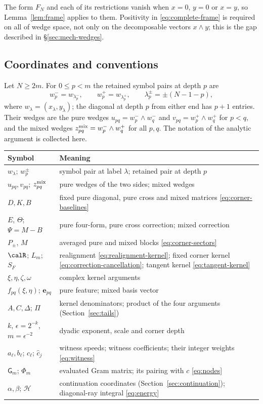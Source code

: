 The form $F_N$ and each of its restrictions vanish when $x=0$, $y=0$ or
$x=y$, so Lemma~\ref{lem:frame} applies to them. Positivity in
\eqref{eq:complete-frame} is required on all of wedge space, not only on
the decomposable vectors $x\wedge y$; this is the gap described in
\S\ref{sec:mech-wedges}.

\subsection{Coordinates and conventions}
Let $N\ge2m$. For $0\le p<m$ the retained symbol pairs at depth $p$ are
\[
 w_p^-=w_{\lambda_p^-},\qquad w_p^+=w_{\lambda_p^+},\qquad
 \lambda_p^\pm=\pm(N-1-p),
\]
where $w_\lambda=(x_\lambda,y_\lambda)$; the diagonal at depth $p$ from
either end has $p+1$ entries. Their wedges are the pure wedges
\(u_{pq}=w_p^-\wedge w_q^-\) and \(v_{pq}=w_p^+\wedge w_q^+\) for \(p<q\),
and the mixed wedges \(z^{\rm mix}_{pq}=w_p^-\wedge w_q^+\) for all \(p,q\).
The notation of the analytic argument is collected here.
\begin{center}
\begin{tabular}{@{}p{}p{}@{}}
\toprule
Symbol & Meaning\\\midrule
$w_\lambda$; $w_p^\pm$ & symbol pair at label $\lambda$; retained pair at depth $p$\\
$u_{pq},v_{pq}$; $z^{\rm mix}_{pq}$ & pure wedges of the two sides; mixed wedges\\
$D,K,B$ & fixed pure diagonal, pure cross and mixed matrices \eqref{eq:corner-baselines}\\
$E$, $\Theta$; $\Psi=M-B$ & pure four-form, pure cross correction; mixed correction\\
$P_\pm$, $M$ & averaged pure and mixed blocks \eqref{eq:corner-sectors}\\
$\calR$; $L_m$; $S_F$ & realignment \eqref{eq:realignment-kernel}; fixed corner kernel \eqref{eq:correction-cancellation}; tangent kernel \eqref{eq:tangent-kernel}\\
$\xi,\eta,\zeta,\omega$ & complex kernel arguments\\
$f_{pq}(\xi,\eta)$; $\mathbf e_{pq}$ & pure feature; mixed basis vector\\
$A,C,\Delta$; $\Pi$ & kernel denominators; product of the four arguments (Section~\ref{sec:tails})\\
$k$, $\epsilon=2^{-k}$, $m=\epsilon^{-2}$ & dyadic exponent, scale and corner depth\\
$a_\ell,b_\ell$; $c_\ell$; $\hat c_j$ & witness speeds; witness coefficients; their integer weights \eqref{eq:witness}\\
$\mathsf G_m$; $\Phi_m$ & evaluated Gram matrix; its pairing with $c$ \eqref{eq:nodes}\\
$\alpha,\beta$; $\mathcal H$ & continuation coordinates (Section~\ref{sec:continuation}); diagonal-ray integral \eqref{eq:energy}\\
\bottomrule
\end{tabular}
\end{center}

